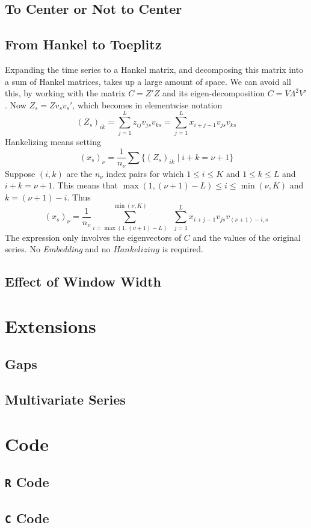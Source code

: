 \documentclass[11pt]{amsart}
\theoremstyle{plain}
\theoremstyle{definition}
\theoremstyle{remark}
\begin{document}
\subsection{To Center or Not to Center}
\subsection{From Hankel to Toeplitz}
Expanding the time series to a Hankel matrix, and decomposing this matrix into a sum of Hankel matrices, takes up a large amount of space. 
We can avoid all this, by working with the matrix \(C=Z'Z\) and its eigen-decomposition \(C=V\Lambda^2 V'\). Now \(Z_s=Zv_sv_s'\),
which becomes in elementwise notation
\[
(Z_s)_{ik}=\sum_{j=1}^L z_{ij}v_{js}v_{ks}=\sum_{j=1}^L x_{i+j-1}v_{js}v_{ks}
\]
Hankelizing means setting
\[
(x_s)_\nu=\frac{1}{n_\nu}\sum\{(Z_s)_{ik}\mid i+k=\nu+1\}
\]
Suppose \((i,k)\) are the \(n_\nu\) index pairs for which \(1\leq i\leq K\) and \(1\leq k\leq L\) and \(i+k=\nu+1\). This means that
\(\max(1,(\nu+1)-L)\leq i\leq\min(\nu,K)\) and \(k=(\nu+1)-i\). Thus
\[
(x_s)_\nu=\frac{1}{n_\nu}\sum_{i=\max(1,(\nu+1)-L)}^{\min(\nu,K)}\ \ \sum_{j=1}^L x_{i+j-1}v_{js}v_{(\nu+1)-i,s}
\]
The expression only involves the eigenvectors of \(C\) and the values of the original series. No \emph{Embedding} and no
\(Hankelizing\) is required.
\subsection{Effect of Window Width}
\section{Extensions}
\subsection{Gaps}
\subsection{Multivariate Series}


\newpage\appendix
\section{Code}
\subsection{\texttt{R} Code}\quad

\subsection{\texttt{C} Code}\quad

\newpage
\end{document}
